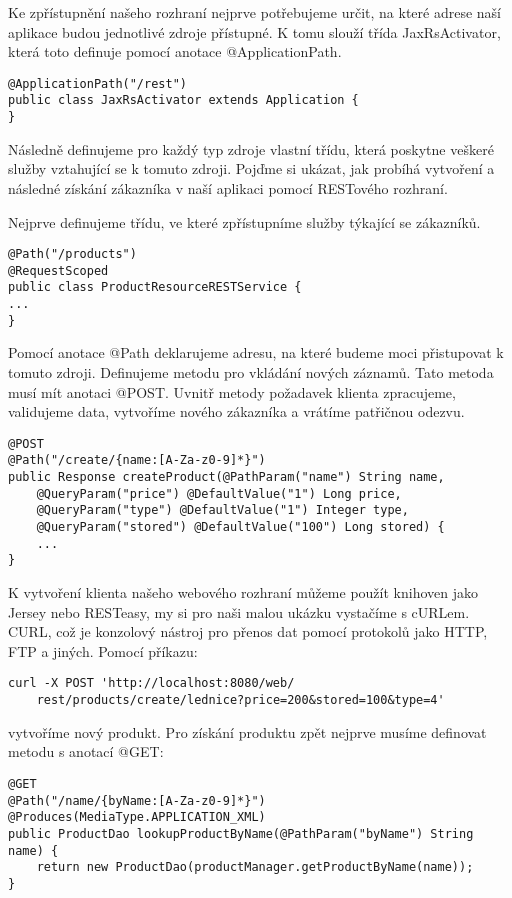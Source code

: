 \documentclass[122pt,oneside]{fithesis}
\begin{document}
Ke zpřístupnění našeho rozhraní nejprve potřebujeme určit, na které adrese naší aplikace budou jednotlivé zdroje přístupné. K tomu slouží třída JaxRsActivator, která toto definuje pomocí anotace @ApplicationPath.

\begin{lstlisting}
@ApplicationPath("/rest")
public class JaxRsActivator extends Application {
}
\end{lstlisting}

Následně definujeme pro každý typ zdroje vlastní třídu, která poskytne veškeré služby vztahující se k tomuto zdroji. Pojďme si ukázat, jak probíhá vytvoření a následné získání zákazníka v naší aplikaci pomocí RESTového rozhraní.

Nejprve definujeme třídu, ve které zpřístupníme služby týkající se zákazníků.

\begin{lstlisting}
@Path("/products")
@RequestScoped
public class ProductResourceRESTService {
...
}
\end{lstlisting}

Pomocí anotace @Path deklarujeme adresu, na které budeme moci přistupovat k tomuto zdroji. Definujeme metodu pro vkládání nových záznamů. Tato metoda musí mít anotaci @POST. Uvnitř metody požadavek klienta zpracujeme, validujeme data, vytvoříme nového zákazníka a vrátíme patřičnou odezvu.

\begin{lstlisting}
@POST
@Path("/create/{name:[A-Za-z0-9]*}")
public Response createProduct(@PathParam("name") String name,
	@QueryParam("price") @DefaultValue("1") Long price,
	@QueryParam("type") @DefaultValue("1") Integer type,
	@QueryParam("stored") @DefaultValue("100") Long stored) {
	...
}
\end{lstlisting}

K vytvoření klienta našeho webového rozhraní můžeme použít knihoven jako Jersey nebo RESTeasy, my si pro naši malou ukázku vystačíme s cURLem. CURL, což je konzolový nástroj pro přenos dat pomocí protokolů jako HTTP, FTP a jiných. Pomocí příkazu:

\begin{lstlisting}
curl -X POST 'http://localhost:8080/web/
	rest/products/create/lednice?price=200&stored=100&type=4'
\end{lstlisting}

vytvoříme nový produkt. Pro získání produktu zpět nejprve musíme definovat metodu s anotací @GET:

\begin{lstlisting}
@GET
@Path("/name/{byName:[A-Za-z0-9]*}")
@Produces(MediaType.APPLICATION_XML)
public ProductDao lookupProductByName(@PathParam("byName") String name) {
	return new ProductDao(productManager.getProductByName(name));
}
\end{lstlisting}
\end{document}
